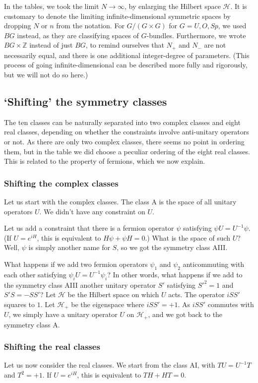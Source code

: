 \documentclass[12pt]{article}
\numberwithin{equation}{section}
\numberwithin{figure}{section}
\theoremstyle{remark}
\def\bZ{\mathbb{Z}}
\def\cH{\mathcal{H}}
\begin{document}
In the tables, we took the limit $N\to\infty$, 
by enlarging the Hilbert space $\cH$. 
It is customary to denote the limiting infinite-dimensional symmetric spaces by 
dropping $N$ or $n$ from the notation.
For $G/(G\times G)$ for $G=U, O, Sp$, we used $BG$
instead, as they are classifying spaces of $G$-bundles.
Furthermore, we wrote $BG\times \bZ$ instead of just $BG$,
to remind ourselves that $N_+$ and $N_-$ are not necessarily equal,
and there is one additional integer-degree of parameters.
(This process of going infinite-dimensional can be described more fully and rigorously, but we will not do so here.)

\subsection{`Shifting' the symmetry classes}
The ten classes can be naturally separated into two complex classes
and eight real classes, depending on whether the constraints involve
anti-unitary operators or not.
As there are only two complex classes, there seems no point in ordering them,
but in the table we did choose a peculiar ordering of the eight real classes.
This is related to the property of fermions, which we now explain.

\subsubsection{Shifting the complex classes}
Let us start with the complex classes.
The class A is the space of all unitary operators $U$.
We didn't have any constraint on $U$.

Let us add a constraint that there is a fermion operator $\psi$
satisfying $\psi U=U^{-1}\psi$.
(If $U=e^{iH}$, this is equivalent to $H\psi+\psi H=0$.)
What is the space of such $U$? 
Well, $\psi$ is simply another name for $S$, so we got the symmetry class AIII.

What happens if we add two fermion operators $\psi_1$ and $\psi_2$
anticommuting with each other satisfying $\psi_i U=U^{-1}\psi_i$?
In other words, what happens if we add to the symmetry class AIII 
another unitary operator $S'$ satisfying $S'^2=1$ and $S'S=-SS'$?
Let $\cH$ be the Hilbert space on which $U$ acts.
The operator $iSS'$ squares to $1$. Let $\cH_+$ be the eigenspace where $iSS'=+1$. 
As $iSS'$ commutes with $U$, we simply have a unitary operator $U$ on $\cH_+$,
and we got back to the symmetry class A.

\subsubsection{Shifting the real classes}
Let us now consider the real classes.
We start from the class AI, with $TU=U^{-1}T$ and $T^2=+1$.
If $U=e^{iH}$, this is equivalent to $TH+HT=0$.
\end{document}
